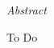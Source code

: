 

\newpage
\thispagestyle{empty}
\begin{center}
\Huge\emph{Abstract}
\end{center}
\medskip
\noindent

To Do
%
%
%
%
%
%
%
%
%
%
